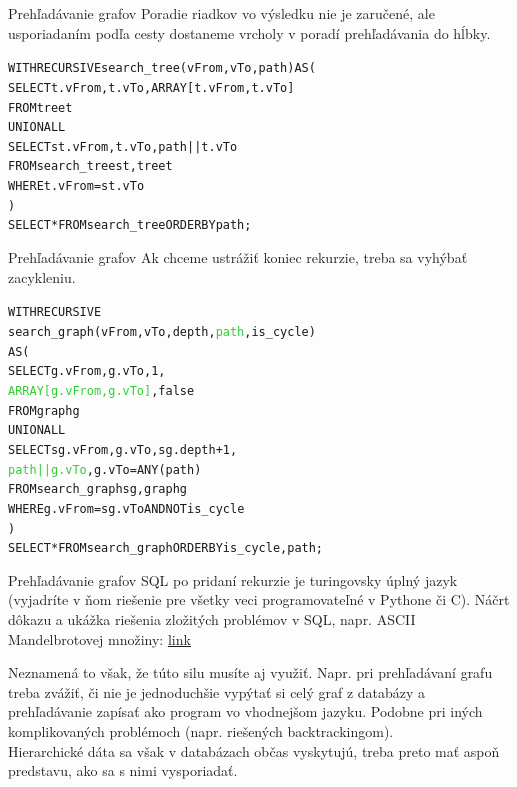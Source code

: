 \documentclass[12pt]{beamer}
\def\blue#1{\textcolor{Cerulean}{#1}}
\def\green#1{\textcolor{LimeGreen}{#1}}
\begin{document}
\begin{frame}[fragile]{Prehľadávanie grafov}
Poradie riadkov vo výsledku nie je zaručené, ale usporiadaním podľa cesty dostaneme vrcholy v poradí \alert{prehľadávania do hĺbky}.
\bigskip
\begin{alltt}
WITH RECURSIVE search_tree(vFrom, vTo, \alert{path}) AS (
    SELECT t.vFrom, t.vTo, \alert{ARRAY[t.vFrom, t.vTo]}
    FROM tree t
  UNION ALL
    SELECT st.vFrom, t.vTo, \alert{path || t.vTo}
    FROM search_tree st, tree t
    WHERE t.vFrom = st.vTo
)
SELECT * FROM search_tree \alert{ORDER BY path};
\end{alltt}
\end{frame}

\begin{frame}[fragile]{Prehľadávanie grafov}
Ak chceme ustrážiť koniec rekurzie, treba sa vyhýbať \alert{zacykleniu}.
\bigskip
{\small
\begin{alltt}
WITH RECURSIVE
    search_graph(vFrom, vTo, depth, \green{path}, \blue{is_cycle})
AS (
    SELECT g.vFrom, g.vTo, 1,
        \green{ARRAY[g.vFrom, g.vTo]}, \blue{false}
    FROM graph g
  UNION ALL
    SELECT sg.vFrom, g.vTo, sg.depth + 1,
        \green{path || g.vTo}, \blue{g.vTo = ANY(path)}
    FROM search_graph sg, graph g
    WHERE g.vFrom = sg.vTo AND \blue{NOT is_cycle}
)
SELECT * FROM search_graph ORDER BY is_cycle, path;
\end{alltt}
}
\end{frame}

\begin{frame}[fragile]{Prehľadávanie grafov}
SQL po pridaní rekurzie je turingovsky úplný jazyk
(vyjadríte v ňom riešenie pre všetky veci programovateľné v Pythone či C).
Náčrt dôkazu a ukážka riešenia zložitých problémov v SQL, napr. ASCII Mandelbrotovej množiny:
\href{https://stackoverflow.com/questions/900055/is-sql-or-even-tsql-turing-complete}{link}
\\[5mm]
\pause

Neznamená to však, že túto silu musíte aj využiť.
Napr. pri prehľadávaní grafu treba zvážiť, či nie je jednoduchšie vypýtať si celý graf
z databázy a prehľadávanie zapísať ako program vo vhodnejšom jazyku.
Podobne pri iných komplikovaných problémoch (napr. riešených backtrackingom).\\[5mm]

Hierarchické dáta sa však v databázach občas vyskytujú, treba preto mať aspoň predstavu, ako sa s nimi vysporiadať.
\end{frame}
\end{document}
